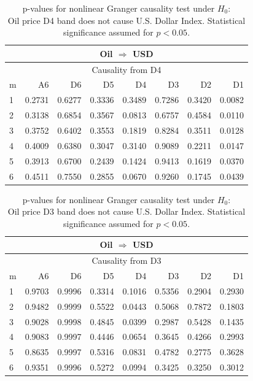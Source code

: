 %
%
\begin{table}[H]
\begin{center}
\begin{tabular}{l|r r r r r r r}
\hline\hline
\multicolumn{8}{c}{Oil $\Rightarrow$ USD}\\
\hline
\multicolumn{8}{c}{Causality from D4}\\
\hline\hline
m & A6 & D6 & D5 & D4 & D3 & D2 & D1 \\
\hline
1 & 0.2731 & 0.6277 & 0.3336 & 0.3489 & 0.7286 & 0.3420 & \cellcolor{mygrey}0.0082 \\
2 & 0.3138 & 0.6854 & 0.3567 & 0.0813 & 0.6757 & 0.4584 & \cellcolor{mygrey}0.0110 \\
3 & 0.3752 & 0.6402 & 0.3553 & 0.1819 & 0.8284 & 0.3511 & \cellcolor{mygrey}0.0128 \\
4 & 0.4009 & 0.6380 & 0.3047 & 0.3140 & 0.9089 & 0.2211 & \cellcolor{mygrey}0.0147 \\
5 & 0.3913 & 0.6700 & 0.2439 & 0.1424 & 0.9413 & 0.1619 & \cellcolor{mygrey}0.0370 \\
6 & 0.4511 & 0.7550 & 0.2855 & 0.0670 & 0.9260 & 0.1745 & \cellcolor{mygrey}0.0439 \\
\hline\hline
\end{tabular}
\caption{p-values for nonlinear Granger causality test under $H_0$:\\
Oil price D4 band does not cause U.S. Dollar Index. Statistical significance assumed for $p<0.05$.}
\end{center}
\end{table}

%
%
\begin{table}[H]
\begin{center}
\begin{tabular}{l|r r r r r r r}
\hline\hline
\multicolumn{8}{c}{Oil $\Rightarrow$ USD}\\
\hline
\multicolumn{8}{c}{Causality from D3}\\
\hline\hline
m & A6 & D6 & D5 & D4 & D3 & D2 & D1 \\
\hline
1 & 0.9703 & 0.9996 & 0.3314 & 0.1016 & 0.5356 & 0.2904 & 0.2930 \\
2 & 0.9482 & 0.9999 & 0.5522 & \cellcolor{mygrey}0.0443 & 0.5068 & 0.7872 & 0.1803 \\
3 & 0.9028 & 0.9998 & 0.4845 & \cellcolor{mygrey}0.0399 & 0.2987 & 0.5428 & 0.1435 \\
4 & 0.9083 & 0.9997 & 0.4446 & 0.0654 & 0.3645 & 0.4266 & 0.2993 \\
5 & 0.8635 & 0.9997 & 0.5316 & 0.0831 & 0.4782 & 0.2775 & 0.3628 \\
6 & 0.9351 & 0.9996 & 0.5272 & 0.0994 & 0.3425 & 0.3250 & 0.3012 \\
\hline\hline
\end{tabular}
\caption{p-values for nonlinear Granger causality test under $H_0$:\\
Oil price D3 band does not cause U.S. Dollar Index. Statistical significance assumed for $p<0.05$.}
\end{center}
\end{table}

